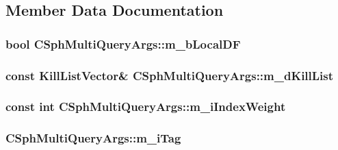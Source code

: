 \subsection{Member Data Documentation}
\hypertarget{structCSphMultiQueryArgs_a4a4e6fec965556a714fa2e824b757356}{
\subsubsection[{m\-\_\-b\-Local\-D\-F}]{\setlength{\rightskip}{0pt plus 5cm}bool C\-Sph\-Multi\-Query\-Args\-::m\-\_\-b\-Local\-D\-F}}\label{structCSphMultiQueryArgs_a4a4e6fec965556a714fa2e824b757356}
\hypertarget{structCSphMultiQueryArgs_ad6f6db1e345aea6ba757cc063274b9d1}{
\subsubsection[{m\-\_\-d\-Kill\-List}]{\setlength{\rightskip}{0pt plus 5cm}const {\bf Kill\-List\-Vector}\& C\-Sph\-Multi\-Query\-Args\-::m\-\_\-d\-Kill\-List}}\label{structCSphMultiQueryArgs_ad6f6db1e345aea6ba757cc063274b9d1}
\hypertarget{structCSphMultiQueryArgs_acb4e90c2aab8ba6a1752c88dd599d48d}{
\subsubsection[{m\-\_\-i\-Index\-Weight}]{\setlength{\rightskip}{0pt plus 5cm}const {\bf int} C\-Sph\-Multi\-Query\-Args\-::m\-\_\-i\-Index\-Weight}}\label{structCSphMultiQueryArgs_acb4e90c2aab8ba6a1752c88dd599d48d}
\hypertarget{structCSphMultiQueryArgs_a9ca73a2868638145231e9987e0082023}{
\subsubsection[{m\-\_\-i\-Tag}]{ C\-Sph\-Multi\-Query\-Args\-::m\-\_\-i\-Tag}}\label{structCSphMultiQueryArgs_a9ca73a2868638145231e9987e0082023}

